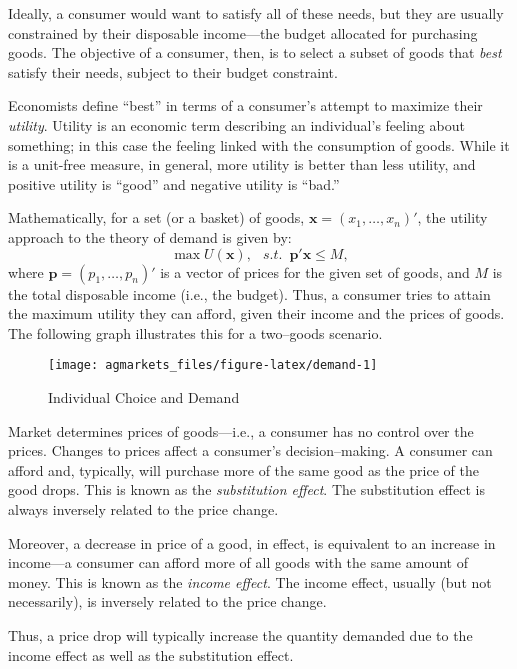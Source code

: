 \documentclass[
  oneside]{book}
\begin{document}
Ideally, a consumer would want to satisfy all of these needs, but they are usually constrained by their disposable income---the budget allocated for purchasing goods. The objective of a consumer, then, is to select a subset of goods that \emph{best} satisfy their needs, subject to their budget constraint.

Economists define ``best'' in terms of a consumer's attempt to maximize their \emph{utility}. Utility is an economic term describing an individual's feeling about something; in this case the feeling linked with the consumption of goods. While it is a unit-free measure, in general, more utility is better than less utility, and positive utility is ``good'' and negative utility is ``bad.''

Mathematically, for a set (or a basket) of goods, \(\mathbf{x}=(x_1,\ldots,x_n)'\), the utility approach to the theory of demand is given by: \[\max U(\mathbf{x}),\;~~s.t.\;~\mathbf{p}'\mathbf{x} \leq M,\] where \(\mathbf{p}=(p_1,\ldots,p_n)'\) is a vector of prices for the given set of goods, and \(M\) is the total disposable income (i.e., the budget). Thus, a consumer tries to attain the maximum utility they can afford, given their income and the prices of goods. The following graph illustrates this for a two--goods scenario.

\begin{figure}

{\centering \texttt{[image: agmarkets\_files/figure-latex/demand-1]} 

}

\caption{Individual Choice and Demand}\label{fig:demand}
\end{figure}

Market determines prices of goods---i.e., a consumer has no control over the prices. Changes to prices affect a consumer's decision--making. A consumer can afford and, typically, will purchase more of the same good as the price of the good drops. This is known as the \emph{substitution effect}. The substitution effect is always inversely related to the price change.

Moreover, a decrease in price of a good, in effect, is equivalent to an increase in income---a consumer can afford more of all goods with the same amount of money. This is known as the \emph{income effect}. The income effect, usually (but not necessarily), is inversely related to the price change.

Thus, a price drop will typically increase the quantity demanded due to the income effect as well as the substitution effect.
\end{document}
